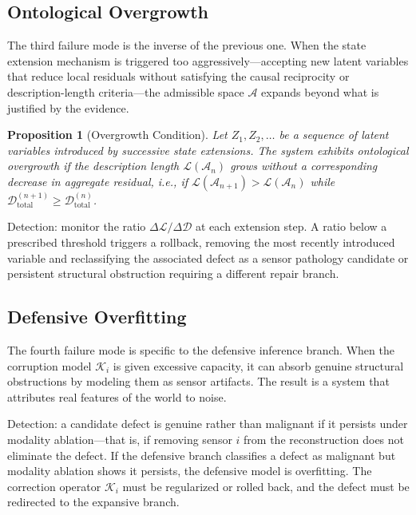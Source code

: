 \documentclass[12pt, oneside]{article}
\newtheorem{proposition}{Proposition}
\begin{document}
\subsection{Ontological Overgrowth}

The third failure mode is the inverse of the previous one. When the state extension mechanism is triggered too aggressively---accepting new latent variables that reduce local residuals without satisfying the causal reciprocity or description-length criteria---the admissible space $\mathcal{A}$ expands beyond what is justified by the evidence.

\begin{proposition}[Overgrowth Condition]
Let $Z_1, Z_2, \ldots$ be a sequence of latent variables introduced by successive state extensions. The system exhibits ontological overgrowth if the description length $\mathcal{L}(\mathcal{A}_n)$ grows without a corresponding decrease in aggregate residual, i.e., if $\mathcal{L}(\mathcal{A}_{n+1}) > \mathcal{L}(\mathcal{A}_n)$ while $\mathcal{D}_{\text{total}}^{(n+1)} \geq \mathcal{D}_{\text{total}}^{(n)}$.
\end{proposition}

Detection: monitor the ratio $\Delta\mathcal{L} / \Delta\mathcal{D}$ at each extension step. A ratio below a prescribed threshold triggers a rollback, removing the most recently introduced variable and reclassifying the associated defect as a sensor pathology candidate or persistent structural obstruction requiring a different repair branch.

\subsection{Defensive Overfitting}

The fourth failure mode is specific to the defensive inference branch. When the corruption model $\mathcal{K}_i$ is given excessive capacity, it can absorb genuine structural obstructions by modeling them as sensor artifacts. The result is a system that attributes real features of the world to noise.

Detection: a candidate defect is genuine rather than malignant if it persists under modality ablation---that is, if removing sensor $i$ from the reconstruction does not eliminate the defect. If the defensive branch classifies a defect as malignant but modality ablation shows it persists, the defensive model is overfitting. The correction operator $\mathcal{K}_i$ must be regularized or rolled back, and the defect must be redirected to the expansive branch.
\end{document}
